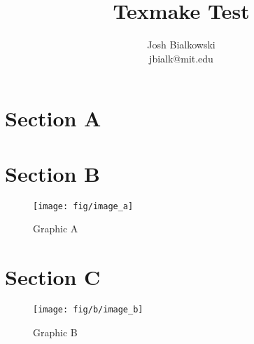 \documentclass[10pt,oneside]{article}
\title{Texmake Test}
\author{Josh Bialkowski \\ \small jbialk@mit.edu}
\begin{document}
\maketitle
\section{Section A}

\section{Section B}

\begin{figure}[h]
\begin{centering}
    \texttt{[image: fig/image\_a]}
    \caption{Graphic A}
\end{centering}
\end{figure}

\section{Section C}

\begin{figure}[h]
\begin{centering}
    \texttt{[image: fig/b/image\_b]}
    \caption{Graphic B}
\end{centering}
\end{figure}



\end{document}
